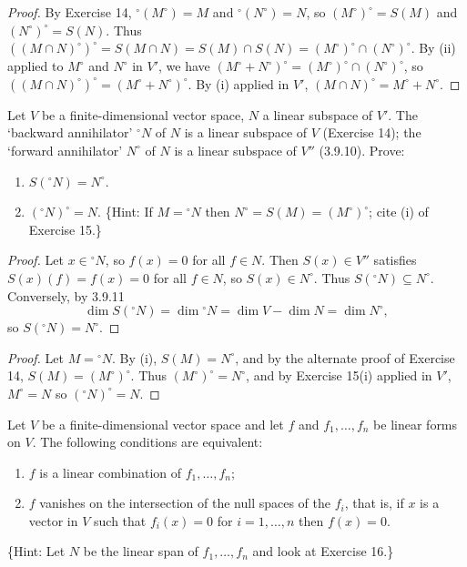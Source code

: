 \begin{proof}
    By Exercise 14, ${}^\circ(M^\circ) = M$ and ${}^\circ(N^\circ) = N$, so
    $(M^\circ)^\circ = S(M)$ and $(N^\circ)^\circ = S(N)$.
    Thus $((M \cap N)^\circ)^\circ = S(M \cap N) = S(M) \cap S(N) = (M^\circ)^\circ \cap (N^\circ)^\circ$.
    By (ii) applied to $M^\circ$ and $N^\circ$ in $V'$, we have
    $(M^\circ + N^\circ)^\circ = (M^\circ)^\circ \cap (N^\circ)^\circ$,
    so $((M \cap N)^\circ)^\circ = (M^\circ + N^\circ)^\circ$.
    By (i) applied in $V'$, $(M \cap N)^\circ = M^\circ + N^\circ$.
\end{proof}


\begin{tcolorbox}[title=Exercise 16, breakable]
    Let $V$ be a finite-dimensional vector space, $N$ a linear subspace of $V'$. 
    The `backward annihilator' ${}^\circ N$ of $N$ is a linear subspace of $V$ (Exercise 
    14); the `forward annihilator' $N^\circ$ of $N$ is a linear subspace of $V''$ 
    (3.9.10). Prove:
    \begin{enumerate}
        \item[(i)] $S({}^\circ N) = N^\circ$.
        \item[(ii)] $({}^\circ N)^\circ = N$. \{Hint: If $M = {}^\circ N$ then $N^\circ = S(M) = (M^\circ)^\circ$; cite (i) of 
        Exercise 15.\}
    \end{enumerate}
\end{tcolorbox}

\begin{proof}
    Let $x \in {}^\circ N$, so $f(x) = 0$ for all $f \in N$.
    Then $S(x) \in V''$ satisfies $S(x)(f) = f(x) = 0$ for all $f \in N$,
    so $S(x) \in N^\circ$. Thus $S({}^\circ N) \subseteq N^\circ$.
    Conversely, by 3.9.11
    \[\dim S({}^\circ N) = \dim {}^\circ N = \dim V - \dim N = \dim N^\circ,\]
    so $S({}^\circ N) = N^\circ$.
\end{proof}

\begin{proof}
    Let $M = {}^\circ N$. By (i), $S(M) = N^\circ$, and by the alternate proof
    of Exercise 14, $S(M) = (M^\circ)^\circ$. Thus $(M^\circ)^\circ = N^\circ$,
    and by Exercise 15(i) applied in $V'$, $M^\circ = N$ so $({}^\circ N)^\circ = N$.
\end{proof}

\begin{tcolorbox}[title=Exercise 17, breakable]
    Let $V$ be a finite-dimensional vector space and let $f$ and $f_1, \ldots, f_n$ be 
    linear forms on $V$. The following conditions are equivalent:
    \begin{enumerate}
        \item[(a)] $f$ is a linear combination of $f_1, \ldots, f_n$;
        \item[(b)] $f$ vanishes on the intersection of the null spaces of the $f_i$, that is, if 
        $x$ is a vector in $V$ such that $f_i(x) = 0$ for $i = 1, \ldots, n$ then $f(x) = 0$.
    \end{enumerate}
    \{Hint: Let $N$ be the linear span of $f_1, \ldots, f_n$ and look at Exercise 16.\}
\end{tcolorbox}

